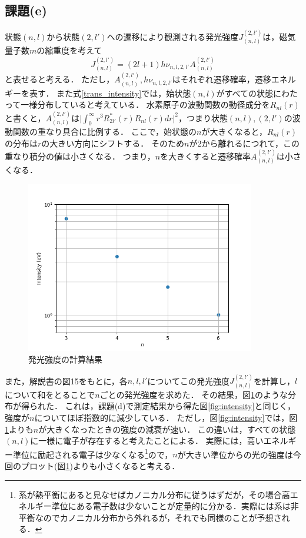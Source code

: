 \documentclass[titlepage]{jsarticle}
\begin{document}
\subsection{課題(e)}

状態$(n,l)$から状態$(2,l')$への遷移により観測される発光強度$J_{(n,l)}^{(2,l')}$は，磁気量子数$m$の縮重度を考えて
\begin{equation}
  J_{(n,l)}^{(2,l')} = (2l+1)h\nu_{n,l,2,l'} A_{(n,l)}^{(2,l')} \label{trans_intensity}
\end{equation}
と表せると考える．
ただし，$A_{(n,l)}^{(2,l')}, h\nu_{n,l,2,l'}$はそれぞれ遷移確率，遷移エネルギーを表す．
また式\eqref{trans_intensity}では，始状態$(n,l)$がすべての状態にわたって一様分布していると考えている．
水素原子の波動関数の動径成分を$R_{nl}(r)$と書くと，$A_{(n,l)}^{(2,l')}$は$\lvert \int_0^{\infty} r^3 R^{\ast}_{2l'}(r) R_{nl}(r) dr \rvert^2$，つまり状態$(n,l), (2,l')$の波動関数の重なり具合に比例する．
ここで，始状態の$n$が大きくなると，$R_{nl}(r)$の分布は$r$の大きい方向にシフトする．
そのため$n$が2から離れるにつれて，この重なり積分の値は小さくなる．
つまり，$n$を大きくすると遷移確率$A_{(n,l)}^{(2,l')}$は小さくなる．

\begin{figure}[htbp]
  \centering
  \includegraphics[width=10cm]{intensity_prob.png}
  \caption{発光強度の計算結果}
  \label{fig:intensity_prob}
\end{figure}

また，解説書の図15をもとに，各$n,l,l'$についてこの発光強度$J_{(n,l)}^{(2,l')}$を計算し，$l$について和をとることで$n$ごとの発光強度を求めた．
その結果，図\ref{fig:intensity_prob}のような分布が得られた．
これは，課題(d)で測定結果から得た図\ref{fig:intensity}と同じく，強度が$n$についてほぼ指数的に減少している．
ただし，図\ref{fig:intensity}では，図\ref{fig:intensity_prob}よりも$n$が大きくなったときの強度の減衰が速い．
この違いは，すべての状態$(n,l)$に一様に電子が存在すると考えたことによる．
実際には，高いエネルギー準位に励起される電子は少なくなる\footnote{系が熱平衡にあると見なせばカノニカル分布に従うはずだが，その場合高エネルギー準位にある電子数は少ないことが定量的に分かる．実際には系は非平衡なのでカノニカル分布から外れるが，それでも同様のことが予想される．}ので，$n$が大きい準位からの光の強度は今回のプロット(図\ref{fig:intensity_prob})よりも小さくなると考える．
\end{document}
